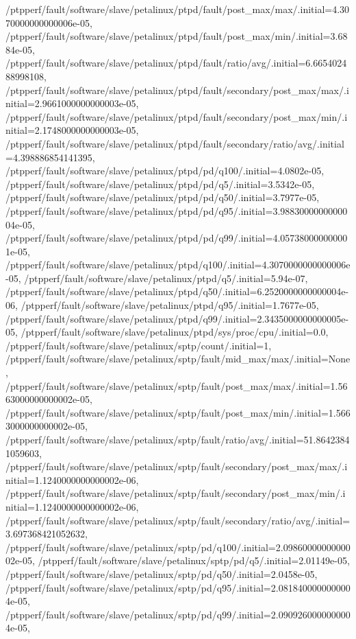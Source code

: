 {    /ptpperf/fault/software/slave/petalinux/ptpd/fault/post_max/max/.initial=4.3070000000000006e-05,
    /ptpperf/fault/software/slave/petalinux/ptpd/fault/post_max/min/.initial=3.6884e-05,
    /ptpperf/fault/software/slave/petalinux/ptpd/fault/ratio/avg/.initial=6.665402488998108,
    /ptpperf/fault/software/slave/petalinux/ptpd/fault/secondary/post_max/max/.initial=2.9661000000000003e-05,
    /ptpperf/fault/software/slave/petalinux/ptpd/fault/secondary/post_max/min/.initial=2.1748000000000003e-05,
    /ptpperf/fault/software/slave/petalinux/ptpd/fault/secondary/ratio/avg/.initial=4.398886854141395,
    /ptpperf/fault/software/slave/petalinux/ptpd/pd/q100/.initial=4.0802e-05,
    /ptpperf/fault/software/slave/petalinux/ptpd/pd/q5/.initial=3.5342e-05,
    /ptpperf/fault/software/slave/petalinux/ptpd/pd/q50/.initial=3.7977e-05,
    /ptpperf/fault/software/slave/petalinux/ptpd/pd/q95/.initial=3.9883000000000004e-05,
    /ptpperf/fault/software/slave/petalinux/ptpd/pd/q99/.initial=4.057380000000001e-05,
    /ptpperf/fault/software/slave/petalinux/ptpd/q100/.initial=4.3070000000000006e-05,
    /ptpperf/fault/software/slave/petalinux/ptpd/q5/.initial=5.94e-07,
    /ptpperf/fault/software/slave/petalinux/ptpd/q50/.initial=6.2520000000000004e-06,
    /ptpperf/fault/software/slave/petalinux/ptpd/q95/.initial=1.7677e-05,
    /ptpperf/fault/software/slave/petalinux/ptpd/q99/.initial=2.3435000000000005e-05,
    /ptpperf/fault/software/slave/petalinux/ptpd/sys/proc/cpu/.initial=0.0,
    /ptpperf/fault/software/slave/petalinux/sptp/count/.initial=1,
    /ptpperf/fault/software/slave/petalinux/sptp/fault/mid_max/max/.initial=None,
    /ptpperf/fault/software/slave/petalinux/sptp/fault/post_max/max/.initial=1.5663000000000002e-05,
    /ptpperf/fault/software/slave/petalinux/sptp/fault/post_max/min/.initial=1.5663000000000002e-05,
    /ptpperf/fault/software/slave/petalinux/sptp/fault/ratio/avg/.initial=51.86423841059603,
    /ptpperf/fault/software/slave/petalinux/sptp/fault/secondary/post_max/max/.initial=1.1240000000000002e-06,
    /ptpperf/fault/software/slave/petalinux/sptp/fault/secondary/post_max/min/.initial=1.1240000000000002e-06,
    /ptpperf/fault/software/slave/petalinux/sptp/fault/secondary/ratio/avg/.initial=3.697368421052632,
    /ptpperf/fault/software/slave/petalinux/sptp/pd/q100/.initial=2.0986000000000002e-05,
    /ptpperf/fault/software/slave/petalinux/sptp/pd/q5/.initial=2.01149e-05,
    /ptpperf/fault/software/slave/petalinux/sptp/pd/q50/.initial=2.0458e-05,
    /ptpperf/fault/software/slave/petalinux/sptp/pd/q95/.initial=2.0818400000000004e-05,
    /ptpperf/fault/software/slave/petalinux/sptp/pd/q99/.initial=2.0909260000000004e-05,
}
